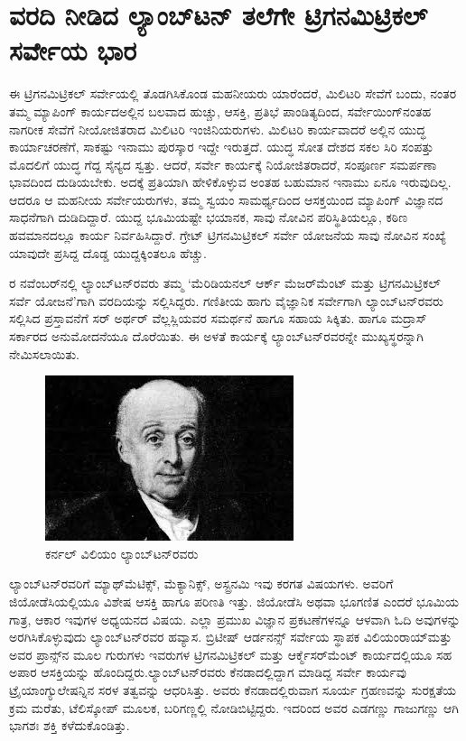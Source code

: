 
\chapter{ವರದಿ ನೀಡಿದ ಲ್ಯಾಂಬ್​ಟನ್​ ತಲೆಗೇ ಟ್ರಿಗನಮಿಟ್ರಿಕಲ್​ ಸರ್ವೇಯ ಭಾರ}

ಈ ಟ್ರಿಗನಮಿಟ್ರಿಕಲ್​ ಸರ್ವೇಯಲ್ಲಿ ತೊಡಗಿಸಿಕೊಂಡ ಮಹನೀಯರು ಯಾರೆಂದರೆ, ಮಿಲಿಟರಿ ಸೇವೆಗೆ ಬಂದು, ನಂತರ ತಮ್ಮ ಮ್ಯಾಪಿಂಗ್​ ಕಾರ್ಯದಅಲ್ಲಿನ ಬಲವಾದ ಹುಚ್ಚು, ಆಸಕ್ತಿ, ಪ್ರತಿಭೆ ಪಾಂಡಿತ್ಯದಿಂದ, ಸರ್ವೇಯಿಂಗ್​ನಂತಹ ನಾಗರೀಕ ಸೇವೆಗೆ ನೀಯೋಜಿತರಾದ ಮಿಲಿಟರಿ ಇಂಜಿನಿಯರುಗಳು. ಮಿಲಿಟರಿ ಕಾರ್ಯವಾದರೆ ಅಲ್ಲಿನ ಯುದ್ಧ ಕಾರ್ಯಾಚರಣೆಗೆ, ಸಾಕಷ್ಟು ಇನಾಮು ಪುರಸ್ಕಾರ ಇದ್ದೇ ಇರುತ್ತದೆ. ಯುದ್ಧ ಸೋತ ದೇಶದ ಸಕಲ ಸಿರಿ ಸಂಪತ್ತು ಮೊದಲಿಗೆ ಯುದ್ಧ ಗೆದ್ದ ಸೈನ್ಯದ ಸ್ವತ್ತು. ಆದರೆ, ಸರ್ವೇ ಕಾರ್ಯಕ್ಕೆ ನಿಯೋಜಿತರಾದರೆ, ಸಂಪೂರ್ಣ ಸಮರ್ಪಣಾ ಭಾವದಿಂದ ದುಡಿಯಬೇಕು. ಅದಕ್ಕೆ ಪ್ರತಿಯಾಗಿ ಹೇಳಿಕೊಳ್ಳುವ ಅಂತಹ ಬಹುಮಾನ ಇನಾಮು ಏನೂ ಇರುವುದಿಲ್ಲ. ಆದರೂ ಆ ಮಹನೀಯ ಸರ್ವೇಯರುಗಳು, ತಮ್ಮ ಸ್ವಯಂ ಸಾಮರ್ಥ್ಯದಿಂದ ಆಸಕ್ತಯಿಂದ ಮ್ಯಾಪಿಂಗ್​ ವಿಜ್ಞಾನದ ಸಾಧನೆಗಾಗಿ ದುಡಿದಿದ್ದಾರೆ. ಯುದ್ದ ಭೂಮಿಯಷ್ಟೇ ಭಯಾನಕ, ಸಾವು ನೋವಿನ ಪರಿಸ್ಥಿತಿಯಲ್ಲೂ, ಕಠಿಣ ಹವಮಾನದಲ್ಲೂ ಕಾರ್ಯ ನಿರ್ವಹಿಸಿದ್ದಾರೆ. ಗ್ರೇಟ್​ ಟ್ರಿಗನಮಿಟ್ರಿಕಲ್​ ಸರ್ವೇ ಯೋಜನೆಯ ಸಾವು ನೋವಿನ ಸಂಖ್ಯೆ ಯಾವುದೇ ಪ್ರಸಿದ್ದ ದೊಡ್ಡ ಯುದ್ದಕ್ಕಿಂತಲೂ ಹೆಚ್ಚು.

ರ ನವೆಂಬರ್​ನಲ್ಲಿ ಲ್ಯಾಂಬ್​ಟನ್​ರವರು ತಮ್ಮ ‘ಮೆರಿಡಿಯನಲ್​ ಆರ್ಕ್ ಮೆಜರ್\break ​ಮೆಂಟ್​ ಮತ್ತು ಟ್ರಿಗನಮಿಟ್ರಿಕಲ್​ ಸರ್ವೆ ಯೋಜನೆ’ಗಾಗಿ ವರದಿಯನ್ನು ಸಲ್ಲಿಸಿದ್ದರು. ಗಣಿತೀಯ ಹಾಗು ವೈಜ್ಞಾನಿಕ ಸರ್ವೇಗಾಗಿ ಲ್ಯಾಂಬ್​ಟನ್​ರವರು ಸಲ್ಲಿಸಿದ ಪ್ರಸ್ತಾವನೆಗೆ ಸರ್​ ಅರ್ಥರ್​ ವೆಲ್ಲಸ್ಲಿಯವರ ಸಮರ್ಥನೆ ಹಾಗೂ ಸಹಾಯ ಸಿಕ್ಕಿತು. ಹಾಗೂ ಮದ್ರಾಸ್​ ಸರ್ಕಾರದ ಅನುಮೋದನೆಯೂ ದೊರೆಯಿತು. ಈ ಅಳತೆ ಕಾರ್ಯಕ್ಕೆ ಲ್ಯಾಂಬ್​ಟನ್​ರವರನ್ನೇ ಮುಖ್ಯಸ್ಥರನ್ನಾಗಿ ನೇಮಿಸಲಾಯಿತು.

\begin{figure}
\includegraphics[scale=0.6]{"images/image005.jpg"}
\caption{ಕರ್ನಲ್​ ವಿಲಿಯಂ ಲ್ಯಾಂಬ್​ಟನ್​ರವರು}\label{chap4-fig1}
\end{figure}

ಲ್ಯಾಂಬ್​ಟನ್​ರವರಿಗೆ ಮ್ಯಾಥ್​ಮೆಟಿಕ್ಸ್​, ಮೆಕ್ಯಾನಿಕ್ಸ್​, ಅಸ್ಟ್ರನಮಿ ಇವು ಕರಗತ ವಿಷಯಗಳು. ಅವರಿಗೆ ಜಿಯೋಡೆಸಿಯಲ್ಲಿಯೂ ವಿಶೇಷ ಆಸಕ್ತಿ ಹಾಗೂ ಪರಿಣತಿ ಇತ್ತು. ಜಿಯೋಡೆಸಿ ಅಥವಾ ಭೂಗಣಿತ ಎಂದರೆ ಭೂಮಿಯ ಗಾತ್ರ, ಆಕಾರ ಇವುಗಳ ಅಧ್ಯಯನದ ವಿಷಯ. ಎಲ್ಲಾ ಪ್ರಮುಖ ವಿಜ್ಞಾನ ಪ್ರಕಟಣೆಗಳನ್ನೂ ಆಳವಾಗಿ ಓದಿ ಅವುಗಳನ್ನು ಅರಗಿಸಿಕೊಳ್ಳುವುದು ಲ್ಯಾಂಬ್​ಟನ್​ರವರ ಹವ್ಯಾಸ. ಬ್ರಿಟೀಷ್​ ಆರ್ಡನನ್ಸ್​ ಸರ್ವೇಯ ಸ್ಥಾಪಕ ವಿಲಿಯಂರಾಯ್​\break ಮತ್ತು ಅವರ ಪ್ರಾನ್ಸ್​ನ ಮೂಲ ಗುರುಗಳು ಇವರುಗಳ ಟ್ರಿಗನಮಿಟ್ರಿಕಲ್​ ಮತ್ತು ಆರ್ಕ್\break ಮೆಸರ್​ಮೆಂಟ್​ ಕಾರ್ಯದಲ್ಲಿಯೂ ಸಹ ಅಪಾರ ಆಸಕ್ತಿಯನ್ನು ಹೊಂದಿದ್ದರು.\break ಲ್ಯಾಂಬ್​ಟನ್​ರವರು ಕೆನಡಾದಲ್ಲಿದ್ದಾಗ ಮಾಡಿದ್ದ ಸರ್ವೇ ಕಾರ್ಯವು ಟ್ರೈಯಾಂಗ್ಯುಲೇಷನ್ನಿನ ಸರಳ ತತ್ವವನ್ನು ಆಧರಿಸಿತ್ತು. ಅವರು ಕೆನಡಾದಲ್ಲಿರುವಾಗ ಸೂರ್ಯ ಗ್ರಹಣವನ್ನು ಸುರಕ್ಷತೆಯ ಕ್ರಮ ಮರೆತು, ಟೆಲಿಸ್ಕೋಪ್​ ಮೂಲಕ, ಬರಿಗಣ್ಣಲ್ಲಿ ನೋಡಿಬಿಟ್ಟಿದ್ದರು. ಇದರಿಂದ ಅವರ ಎಡಗಣ್ಣು ಗಾಜುಗಣ್ಣು ಆಗಿ ಭಾಗಶಃ ಶಕ್ತಿ ಕಳೆದುಕೊಂಡಿತ್ತು.

